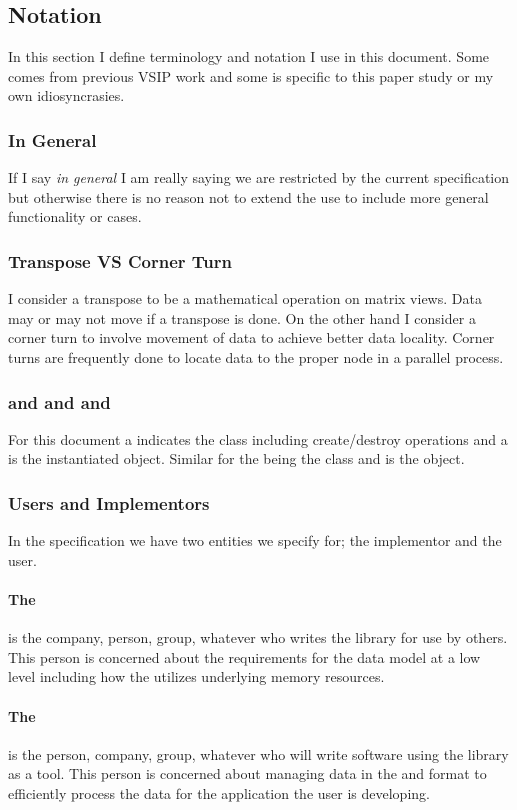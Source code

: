 \subsection{Notation}
In this section I define terminology and notation I use in this document. Some comes from previous VSIP work and some is specific to this paper study or my own idiosyncrasies.
\subsubsection{In General}
If I say \emph{in general} I am really saying we are restricted by the current \cvl{} specification but otherwise there is no reason not to extend the use to include more general functionality or cases. 
\subsubsection{Transpose VS Corner Turn}
I consider a transpose to be a mathematical operation on matrix views. Data may or may not move if a transpose is done. On the other hand I consider a corner turn to involve movement of data to achieve better data locality. Corner turns are frequently done to locate data to the proper node in a parallel process.
\subsubsection{\Blk{} and \Vw{} and \blk{} and \vw}
For this document a \Blk{} indicates the class including create/destroy operations and a \blk{} is the instantiated \Blk{} object. Similar for the \Vw{} being the class and \vw{} is the \Vw{} object.
\subsubsection{Users and Implementors}
In the \cvl{} specification we have two entities we specify for; the implementor and the user. 
\paragraph{The } is the company, person, group, whatever who writes the library for use by others. This person is concerned about the requirements for the data model at a low level including how the \blk{} utilizes underlying memory resources.
\paragraph{The }is the person, company, group, whatever who will write software using the library as a tool. This person is concerned about managing data in the \blk{} and \vw{} format to efficiently process the data for the application the user is developing.
